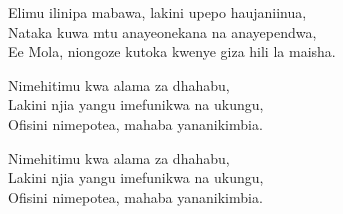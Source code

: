 \begin{lyrics}
Elimu ilinipa mabawa, lakini upepo haujaniinua,\\
Nataka kuwa mtu anayeonekana na anayependwa,\\
Ee Mola, niongoze kutoka kwenye giza hili la maisha.

Nimehitimu kwa alama za dhahabu,\\
Lakini njia yangu imefunikwa na ukungu,\\
Ofisini nimepotea, mahaba yananikimbia.

Nimehitimu kwa alama za dhahabu,\\
Lakini njia yangu imefunikwa na ukungu,\\
Ofisini nimepotea, mahaba yananikimbia.
\end{lyrics}

